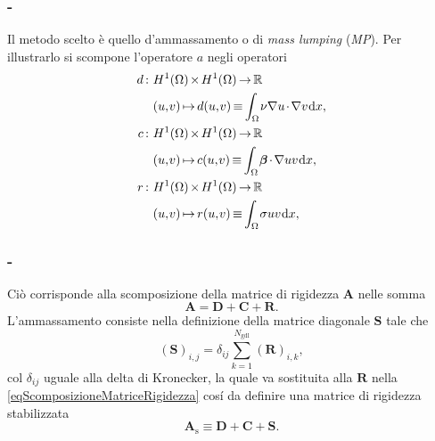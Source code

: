 \documentclass[11pt]{beamer}
\newcommand{\de}{\mathrm{d}}
\newcommand{\Ngdl}{N_{\text{gdl}}}
\begin{document}
                \begin{frame}\frametitle{\titoloSez{} - \insertsubsection{}}
                    Il metodo scelto è quello d'ammassamento o di \textit{mass lumping} (\textit{MP}). Per illustrarlo si scompone l'operatore $a$ negli operatori
                    \begin{equation*}
                        \setlength{\thinmuskip}{1mu}
                        \setlength{\medmuskip}{2mu}
                        \setlength{\thickmuskip}{3mu}
                        \begin{aligned}
                            d:\ &H^1(\Omega)\times H^1(\Omega)\rightarrow\mathbb R\\
                            &(u,v)\mapsto d(u,v)\equiv
                            \int_{\Omega}\nu\nabla u\cdot\nabla v\,\de x,\\
                            c:\ &H^1(\Omega)\times H^1(\Omega)\rightarrow\mathbb R\\
                            &(u,v)\mapsto c(u,v)\equiv
                            \int_{\Omega}\boldsymbol\beta\cdot\nabla uv\,\de x,\\
                            r:\ &H^1(\Omega)\times H^1(\Omega)\rightarrow\mathbb R\\
                            &(u,v)\mapsto r(u,v)\equiv
                            \int_{\Omega}\sigma uv \,\de x,
                        \end{aligned}
                        \label{eqOperatoriBilineariPVAmmassamento}
                    \end{equation*}
                \end{frame}
    
                \begin{frame}\frametitle{\titoloSez{} - \insertsubsection{}}
                    Ciò corrisponde alla scomposizione della matrice di rigidezza $\mathbf A$ nelle somma
                    \begin{equation*}
                        \mathbf A=\mathbf D+\mathbf C+\mathbf R.
                        \label{eqScomposizioneMatriceRigidezza}
                    \end{equation*}
                    L'ammassamento consiste nella definizione della matrice diagonale $\mathbf S$ tale che
                    \begin{equation*}
                        (\mathbf S)_{i,j}=\delta_{ij}\sum_{k=1}^{\Ngdl}(\mathbf R)_{i,k},
                        \label{eqTrasformazioneMatriceR}
                    \end{equation*}
                    col $\delta_{ij}$ uguale alla delta di Kronecker, la quale va sostituita alla $\mathbf R$ nella \eqref{eqScomposizioneMatriceRigidezza} cosí da definire una matrice di rigidezza stabilizzata
                    \begin{equation*}
                        \mathbf A_\text{s}\equiv\mathbf D+\mathbf C+\mathbf S.
                    \end{equation*}
                \end{frame}
\end{document}

